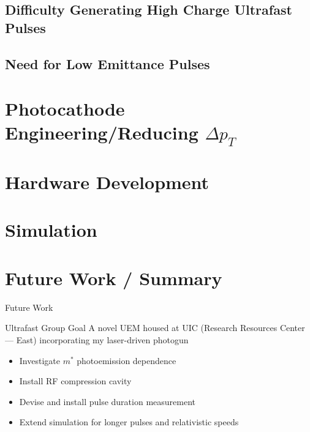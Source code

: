 \documentclass[mathserif]{beamer}
\providecommand{\smallT}[0]{ { \scriptscriptstyle T } }
\begin{document}
\subsection{Difficulty Generating High Charge Ultrafast Pulses}


\subsection{Need for Low Emittance Pulses}


\section{Photocathode Engineering/Reducing $\Delta p_{\smallT}$}


\section{Hardware Development}


\section{Simulation}


\section{Future Work / Summary}

\begin{frame}{Future Work}
  \begin{block}{Ultrafast Group Goal}
    A novel UEM housed at UIC (Research Resources Center --- East) incorporating my laser-driven photogun
  \end{block}
  \begin{itemize}
    \item<2-> Investigate $m^{*}$ photoemission dependence
    \item<3-> Install RF compression cavity
    \item<4-> Devise and install pulse duration measurement
    \item<5-> Extend simulation for longer pulses and relativistic speeds
  \end{itemize}
\end{frame}
\end{document}
